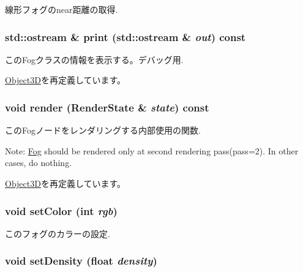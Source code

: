 線形フォグのnear距離の取得. \hypertarget{classm3g_1_1Fog_6fea17fa1532df3794f8cb39cb4f911f}{
\subsubsection[{print}]{\setlength{\rightskip}{0pt plus 5cm}std::ostream \& print (std::ostream \& {\em out}) const}}
\label{classm3g_1_1Fog_6fea17fa1532df3794f8cb39cb4f911f}


このFogクラスの情報を表示する。デバッグ用. 

\hyperlink{classm3g_1_1Object3D_6fea17fa1532df3794f8cb39cb4f911f}{Object3D}を再定義しています。\hypertarget{classm3g_1_1Fog_8babc8a79b78615da51161e94029eea9}{
\subsubsection[{render}]{\setlength{\rightskip}{0pt plus 5cm}void render ({\bf RenderState} \& {\em state}) const}}
\label{classm3g_1_1Fog_8babc8a79b78615da51161e94029eea9}


このFogノードをレンダリングする内部使用の関数.

Note: \hyperlink{classm3g_1_1Fog}{Fog} should be rendered only at second rendering pass(pass=2). In other cases, do nothing. 

\hyperlink{classm3g_1_1Object3D_8babc8a79b78615da51161e94029eea9}{Object3D}を再定義しています。\hypertarget{classm3g_1_1Fog_b1f5cc0f5cc6bbbd716a526c61f1081d}{
\subsubsection[{setColor}]{\setlength{\rightskip}{0pt plus 5cm}void setColor (int {\em rgb})}}
\label{classm3g_1_1Fog_b1f5cc0f5cc6bbbd716a526c61f1081d}


このフォグのカラーの設定. \hypertarget{classm3g_1_1Fog_0ceeda25e326e99d6e971e980a00bd49}{
\subsubsection[{setDensity}]{\setlength{\rightskip}{0pt plus 5cm}void setDensity (float {\em density})}}
\label{classm3g_1_1Fog_0ceeda25e326e99d6e971e980a00bd49}


